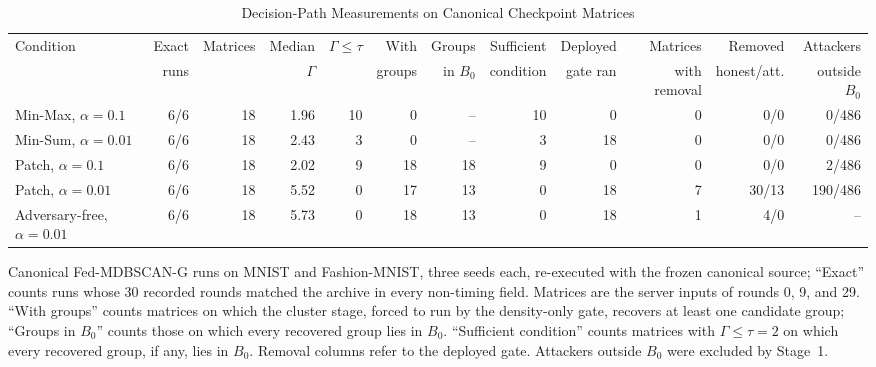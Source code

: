 \begin{table}[!tp]
\centering\footnotesize
\setlength{\tabcolsep}{4pt}
\caption{Decision-Path Measurements on Canonical Checkpoint Matrices}\label{tab:review_e1}
\begin{adjustbox}{max width=\textwidth}
\begin{tabular}{lrrrrrrrrrrr}
\toprule
Condition & Exact & Matrices & Median & $\Gamma\leq\tau$ & With & Groups & Sufficient & Deployed & Matrices & Removed & Attackers \\
 & runs &  & $\Gamma$ &  & groups & in $B_0$ & condition & gate ran & with removal & honest/att. & outside $B_0$ \\
\midrule
Min-Max, $\alpha=0.1$ & 6/6 & 18 & 1.96 & 10 & 0 & -- & 10 & 0 & 0 & 0/0 & 0/486 \\
Min-Sum, $\alpha=0.01$ & 6/6 & 18 & 2.43 & 3 & 0 & -- & 3 & 18 & 0 & 0/0 & 0/486 \\
Patch, $\alpha=0.1$ & 6/6 & 18 & 2.02 & 9 & 18 & 18 & 9 & 0 & 0 & 0/0 & 2/486 \\
Patch, $\alpha=0.01$ & 6/6 & 18 & 5.52 & 0 & 17 & 13 & 0 & 18 & 7 & 30/13 & 190/486 \\
Adversary-free, $\alpha=0.01$ & 6/6 & 18 & 5.73 & 0 & 18 & 13 & 0 & 18 & 1 & 4/0 & -- \\
\bottomrule
\end{tabular}
\end{adjustbox}

\par\vspace{3pt}\parbox{\linewidth}{\footnotesize Canonical Fed-MDBSCAN-G runs on MNIST and Fashion-MNIST, three seeds each, re-executed with the frozen canonical source; ``Exact'' counts runs whose 30 recorded rounds matched the archive in every non-timing field. Matrices are the server inputs of rounds 0, 9, and 29. ``With groups'' counts matrices on which the cluster stage, forced to run by the density-only gate, recovers at least one candidate group; ``Groups in $B_0$'' counts those on which every recovered group lies in $B_0$. ``Sufficient condition'' counts matrices with $\Gamma\leq\tau=2$ on which every recovered group, if any, lies in $B_0$. Removal columns refer to the deployed gate. Attackers outside $B_0$ were excluded by Stage~1.}
\end{table}
